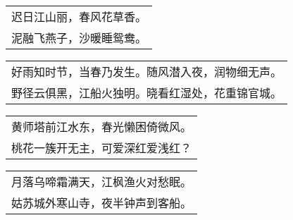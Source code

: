 \noindent\begin{minipage}{\linewidth}
  \vskip-3pt\begin{table}[H]
    \centering
    \begin{tabular}{@{}l@{}}
迟日江山丽，春风花草香。\\
泥融飞燕子，沙暖睡鸳鸯。
    \end{tabular}
  \end{table}
\end{minipage}
\vspace{1cm}


\noindent\begin{minipage}{\linewidth}
  \vskip-3pt\begin{table}[H]
    \centering
    \begin{tabular}{@{}l@{}}
好雨知时节，当春乃发生。随风潜入夜，润物细无声。\\
野径云俱黑，江船火独明。晓看红湿处，花重锦官城。
    \end{tabular}
  \end{table}
\end{minipage}
\vspace{1cm}


\noindent\begin{minipage}{\linewidth}
  \vskip-3pt\begin{table}[H]
    \centering
    \begin{tabular}{@{}l@{}}
黄师塔前江水东，春光懒困倚微风。\\
桃花一簇开无主，可爱深红爱浅红？
    \end{tabular}
  \end{table}
\end{minipage}
\vspace{1cm}


\noindent\begin{minipage}{\linewidth}
  \vskip-3pt\begin{table}[H]
    \centering
    \begin{tabular}{@{}l@{}}
月落乌啼霜满天，江枫渔火对愁眠。\\
姑苏城外寒山寺，夜半钟声到客船。
    \end{tabular}
  \end{table}
\end{minipage}
\vspace{1cm}



